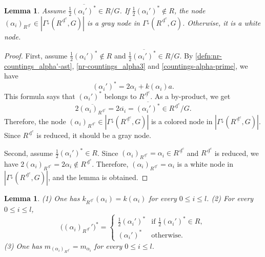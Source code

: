 \documentclass[11pt]{amsart}
\newcommand{\dc}{\,\underline{\mathrm{d}}^c}
\newcommand{\nw}{\mathrm{nw}}
\newtheorem{lemma}[thm]{Lemma}%
\begin{document}
{\begin{lemma}\label{lemma:color-Gamma-R'}
Assume $\frac12 \overline{(\alpha_i')^\ast}\in R/G$. 
If $\frac12 (\alpha_i')^\ast\not\in R$,
the node $(\alpha_i)_{R^{\dc}}\in |\Gamma^{\downarrow}(R^{\dc},G)|$ is a gray node in $\Gamma^\downarrow(R^{\dc},G)$. 
Otherwise, it is a white node. %
\end{lemma}
\begin{proof}
First, assume $\frac12(\alpha_i')^\ast\not\in R$ and 
$\frac12 \overline{(\alpha_i')^\ast}\in R/G$.
By \eqref{defn:nr-countings_alpha'-ast}, \eqref{nr-countings_alpha3} and 
\eqref{countings-alpha-prime}, we have
\[(\alpha_i')^\ast=2\alpha_i+k(\alpha_i)a.\]
This formula says that $(\alpha_i')^\ast$ belongs to $R^{\dc}$. As a 
by-product, we get 
\[2\overline{(\alpha_i)_{R^{\dc}}}=2\overline{\alpha_i}=\overline{(\alpha_i')^\ast}\in R^{\dc}/G.\]
Therefore, the node $(\alpha_{i})_{R^{\dc}}\in |\Gamma^{\downarrow}(R^{\dc},G)|$ 
is a colored node in $|\Gamma^\downarrow(R^{\dc},G)|$. Since $R^{\dc}$ is reduced, 
it should be a gray node. 

Second, assume $\frac12(\alpha_i')^\ast\in R$. Since 
$(\alpha_i)_{R^{\dc}}=\alpha_i\in R^{\dc}$ and $R^{\dc}$ is reduced, we have
$2(\alpha_i)_{R^{\dc}}=2\alpha_i\not\in R^{\dc}$.
Therefore, $(\alpha_{i})_{R^{\dc}}=\alpha_i$ is a white node
in $|\Gamma^{\downarrow}(R^{\dc},G)|$, and the lemma is obtained.
\end{proof}

\begin{lemma}\label{lemma:data-Gamma-R'}
{\rm (1)} One has $k_{R^{\dc}}(\alpha_i)=k(\alpha_i)$ for every $0\leq i\leq l$.
\vskip 1mm
\noindent
{\rm (2)} For every $0\leq i\leq l$,  
\begin{equation}\label{stared-node-R'}
\big((\alpha_i)_{R^{\dc}}'\big)^\ast=\begin{cases}
\frac12 (\alpha_i')^\ast & \text{if $\frac12 (\alpha_i')^\ast\in R$},\\
(\alpha_i')^\ast & \text{otherwise}.
\end{cases}
\end{equation}
{\rm (3)} One has $m_{(\alpha_i)_{R^{\dc}}}=m_{\alpha_i}$ for every $0\leq i\leq l$. 
\end{lemma}

}
\end{document}
